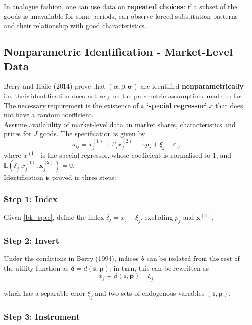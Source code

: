 \documentclass[11pt]{article}
\begin{document}
In analogue fashion, one can use data on \textbf{repeated choices}: if a subset of the goods is unavailable for some periods, can observe forced substitution patterns and their relationship with good characteristics.

\subsection{Nonparametric Identification - Market-Level Data}

Berry and Haile (2014) prove that $(\alpha, \beta, \bm{\sigma})$ are identified \textbf{nonparametrically} - i.e. their identification does not rely on the parametric assumptions made so far.
The necessary requirement is the existence of a \textbf{`special regressor'} $x$ that does not have a random coefficient. \\

Assume availability of market-level data on market shares, characteristics and prices for $J$ goods. The specification is given by
\begin{equation}
	\label{bh_spec}
	u_{ij} = x^{(1)}_j + \beta_i\bm{x}^{(2)}_j - \alpha p_j + \xi_j + \varepsilon_{ij}
\end{equation}
where $x^{(1)}$ is the special regressor, whose coefficient is normalised to 1, and $\mathbb{E}(\xi_j |x^{(1)}_j,\bm{x}^{(2)}_j) = 0$.\\

Identification is proved in three steps:

\subsubsection*{Step 1: Index}
Given \eqref{bh_spec}, define the index $\delta_j = x_j + \xi_j$, excluding $p_j$ and $\bm{x}^{(2)}$.

\subsubsection*{Step 2: Invert}
Under the conditions in Berry (1994), indices $\bm{\delta}$ can be isolated from the rest of the utility function as $\bm{\delta} = d(\bm{s,p})$; in turn, this can be rewritten as
\begin{equation}
	\label{bh_inv}
	x_j = d(\bm{s,p}) - \xi_j
\end{equation}

which has a separable error $\xi_j$ and two sets of endogenous variables $(\bm{s, p})$.

\subsubsection*{Step 3: Instrument}
\end{document}

